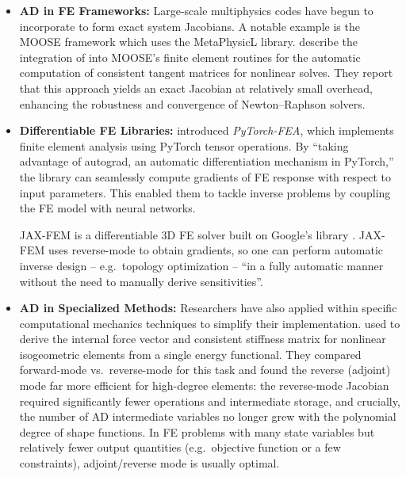 \begin{itemize}
\item
  \textbf{AD in FE Frameworks:} Large-scale multiphysics codes have
  begun to incorporate \autodiff{} to form exact system Jacobians. 
  A notable
  example is the MOOSE framework \citep{MOOSE} which uses the MetaPhysicL \autodiff{}
  library. 
  \cite{lindsay2021automatic} describe the integration of \autodiff{}
  into MOOSE's finite element routines for the automatic
  computation of consistent tangent matrices for nonlinear solves. 
  They report that this approach yields an exact Jacobian at relatively small overhead, enhancing the robustness and convergence of Newton--Raphson solvers. 
\item
  \textbf{Differentiable FE Libraries:} 
  \cite{liang2023pytorchfea} introduced
  \emph{PyTorch-FEA}, which implements finite element analysis using
  PyTorch tensor operations. 
  By ``taking advantage of autograd, an
  automatic differentiation mechanism in PyTorch,'' the library can
  seamlessly compute gradients of FE response with respect to input
  parameters. 
  This enabled them to tackle inverse problems by coupling
  the FE model with neural networks. 

  
  JAX-FEM \citep{xue2023jaxfem}  is a differentiable 3D FE solver built on Google's \Jax library \citep{frostig2018compiling}. 
  JAX-FEM uses reverse-mode \autodiff{} to
  obtain gradients, so one can perform automatic inverse design
  -- e.g.~topology optimization -- ``in a fully automatic manner
  without the need to manually derive sensitivities''. 
\item
  \textbf{AD in Specialized Methods:} Researchers have also applied \autodiff{}
  within specific computational mechanics techniques to simplify their
  implementation. 
  \cite{oberbichler2021efficient} used \autodiff{} to derive the internal force vector and consistent stiffness matrix for
  nonlinear isogeometric elements from a single energy
  functional. 
  They compared forward-mode vs.~reverse-mode
  \autodiff{} for this task and found the reverse (adjoint) mode far more
  efficient for high-degree elements: the reverse-mode Jacobian required
  significantly fewer operations and intermediate storage, and
  crucially, the number of AD intermediate variables no longer grew with
  the polynomial degree of shape functions. 
  In FE problems
  with many state variables but relatively fewer output quantities
  (e.g.~objective function or a few constraints), adjoint/reverse mode
  is usually optimal.
\end{itemize}

